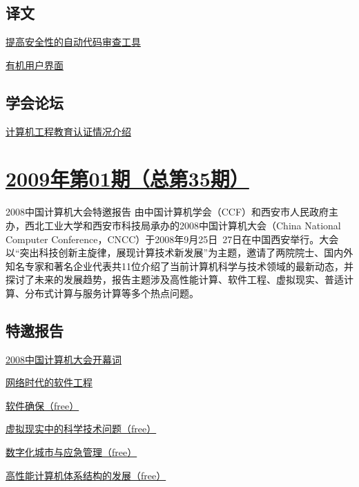 \documentclass[a4paper]{article}
\begin{document}
\subsection{译文}
\href{http://history.ccf.org.cn/resources/1190201776262/2010/04/15/036064.pdf}{提高安全性的自动代码审查工具}

\href{http://history.ccf.org.cn/resources/1190201776262/2010/04/15/036069.pdf}{有机用户界面}

\subsection{学会论坛}
\href{http://history.ccf.org.cn/resources/1190201776262/2010/04/15/036086.pdf}{计算机工程教育认证情况介绍}


\section{\href{http://history.ccf.org.cn/sites/ccf/jsjtbbd.jsp?contentId=2542567629022}{\textbf{2009年第01期（总第35期）}}}
2008中国计算机大会特邀报告 由中国计算机学会（CCF）和西安市人民政府主办，西北工业大学和西安市科技局承办的2008中国计算机大会（China National Computer Conference，CNCC）于2008年9月25日~27日在中国西安举行。大会以“突出科技创新主旋律，展现计算技术新发展”为主题，邀请了两院院士、国内外知名专家和著名企业代表共11位介绍了当前计算机科学与技术领域的最新动态，并探讨了未来的发展趋势，报告主题涉及高性能计算、软件工程、虚拟现实、普适计算、分布式计算与服务计算等多个热点问题。
\subsection{特邀报告}
\href{http://history.ccf.org.cn/resources/1190201776262/2010/04/15/035006.pdf}{2008中国计算机大会开幕词}

\href{http://history.ccf.org.cn/resources/1190201776262/2010/04/15/035007.pdf}{网络时代的软件工程}

\href{http://history.ccf.org.cn/resources/1190201776262/2010/04/15/035013.pdf}{软件确保（free）}

\href{http://history.ccf.org.cn/resources/1190201776262/2010/04/15/035017.pdf}{虚拟现实中的科学技术问题（free）}

\href{http://history.ccf.org.cn/resources/1190201776262/2010/04/15/035022.pdf}{数字化城市与应急管理（free）}

\href{http://history.ccf.org.cn/resources/1190201776262/2010/04/15/035025.pdf}{高性能计算机体系结构的发展（free）}
\end{document}
